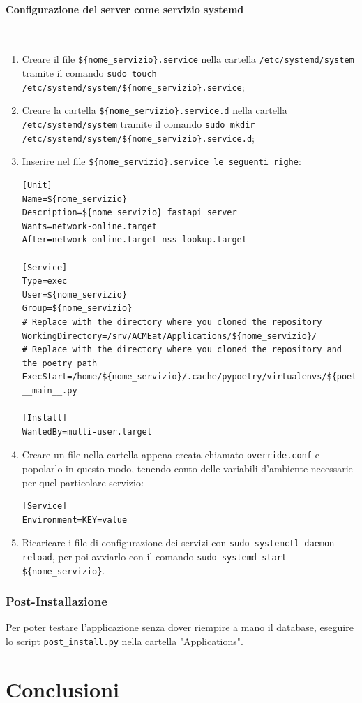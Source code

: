 \documentclass[11pt]{article} %
\begin{document}
\paragraph{Configurazione del server come servizio systemd}\mbox{}\\
\begin{enumerate}
\item Creare il file \verb|${nome_servizio}.service| nella cartella \verb|/etc/systemd/system| tramite il comando \verb|sudo touch /etc/systemd/system/${nome_servizio}.service|;
\item Creare la cartella \verb|${nome_servizio}.service.d| nella cartella \verb|/etc/systemd/system| tramite il comando \verb|sudo mkdir /etc/systemd/system/${nome_servizio}.service.d|;
\item Inserire nel file \verb|${nome_servizio}.service le seguenti righe|:
\begin{lstlisting}
[Unit]
Name=${nome_servizio}
Description=${nome_servizio} fastapi server
Wants=network-online.target
After=network-online.target nss-lookup.target

[Service]
Type=exec
User=${nome_servizio}
Group=${nome_servizio}
# Replace with the directory where you cloned the repository
WorkingDirectory=/srv/ACMEat/Applications/${nome_servizio}/
# Replace with the directory where you cloned the repository and the poetry path
ExecStart=/home/${nome_servizio}/.cache/pypoetry/virtualenvs/${poetry_path}/bin/python3 __main__.py

[Install]
WantedBy=multi-user.target
\end{lstlisting}
\item Creare un file nella cartella appena creata chiamato \verb|override.conf| e popolarlo in questo modo, tenendo conto delle variabili d'ambiente necessarie per quel particolare servizio:
\begin{lstlisting}
[Service]
Environment=KEY=value
\end{lstlisting}
\item Ricaricare i file di configurazione dei servizi con \verb|sudo systemctl daemon-reload|, per poi avviarlo con il comando \verb|sudo systemd start ${nome_servizio}|.
\end{enumerate}

\subsubsection{Post-Installazione}

Per poter testare l'applicazione senza dover riempire a mano il database, eseguire lo script \verb|post_install.py| nella cartella "Applications".

\clearpage

\section{Conclusioni}
\end{document}
